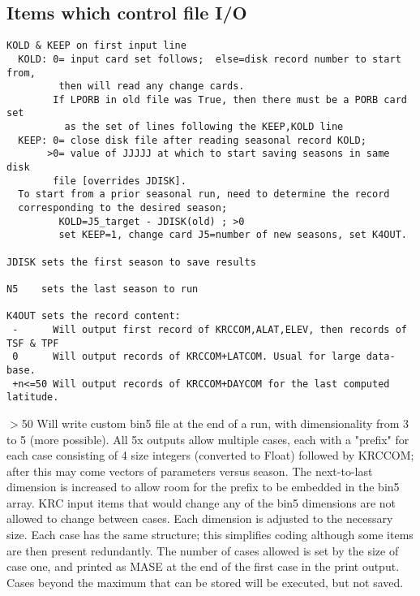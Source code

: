 \documentclass[draft]{article}  %
\begin{document}
\subsection{Items which control file I/O } %
\vspace{-3.mm} 
\begin{verbatim}
KOLD & KEEP on first input line
  KOLD: 0= input card set follows;  else=disk record number to start from,
         then will read any change cards.
        If LPORB in old file was True, then there must be a PORB card set 
          as the set of lines following the KEEP,KOLD line
  KEEP: 0= close disk file after reading seasonal record KOLD;
       >0= value of JJJJJ at which to start saving seasons in same disk 
        file [overrides JDISK].
  To start from a prior seasonal run, need to determine the record 
  corresponding to the desired season;
         KOLD=J5_target - JDISK(old) ; >0
         set KEEP=1, change card J5=number of new seasons, set K4OUT.

JDISK sets the first season to save results

N5    sets the last season to run

K4OUT sets the record content:
 -      Will output first record of KRCCOM,ALAT,ELEV, then records of TSF & TPF
 0      Will output records of KRCCOM+LATCOM. Usual for large data-base.
 +n<=50 Will output records of KRCCOM+DAYCOM for the last computed latitude.
\end{verbatim}
$>$50 Will write custom bin5 file at the end of a run, with dimensionality from
3 to 5 (more possible). All 5x outputs allow multiple cases, each with a
"prefix" for each case consisting of 4 size integers (converted to Float)
followed by KRCCOM; after this may come vectors of parameters versus season. The
next-to-last dimension is increased to allow room for the prefix to be embedded
in the bin5 array.  KRC input items that would change any of the bin5 dimensions
are not allowed to change between cases. Each dimension is adjusted to the
necessary size. Each case has the same structure; this simplifies coding
although some items are then present redundantly. The number of cases allowed is
set by the size of case one, and printed as MASE at the end of the first case in
the print output. Cases beyond the maximum that can be stored will be executed,
but not saved.
\end{document}
